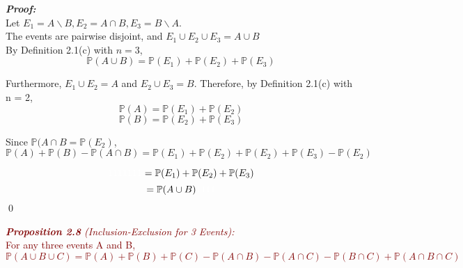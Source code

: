 \documentclass{report}
\newenvironment{cframedp}[1][Black]
  {\begin{tcolorbox}[colframe=#1,colback=white]}
  {\end{tcolorbox}}
\newenvironment{cframedprop}[1][Maroon]
  {\begin{tcolorbox}[colframe=#1,colback=white]}
  {\end{tcolorbox}}
\begin{document}
\begin{cframedp}
\textit{\textbf{Proof:}}\\
Let $E_1 = A \backslash B, E_2 = A \cap B, E_3 = B \backslash A.$\\
The events are pairwise disjoint, and $E_1 \cup E_2 \cup E_3 = A \cup B$\\

By Definition 2.1(c) with $n=3$,
\begin{equation}
    \mathbb{P}(A \cup B) = \mathbb{P}(E_1) + \mathbb{P}(E_2) + \mathbb{P}(E_3)
\end{equation}

Furthermore, $E_1 \cup E_2 = A$ and $E_2 \cup E_3 = B$. Therefore, by Definition 2.1(c) with n = 2,\\
\begin{equation}
    \mathbb{P}(A) = \mathbb{P}(E_1) + \mathbb{P}(E_2)
\end{equation}
\begin{equation}
    \mathbb{P}(B) = \mathbb{P}(E_2) + \mathbb{P}(E_3)
\end{equation}

Since $\mathbb{P}(A \cap B = \mathbb{P}(E_2)$,
\begin{equation}
    \mathbb{P}(A) + \mathbb{P}(B) - \mathbb{P}(A \cap B) = \mathbb{P}(E_1) + \mathbb{P}(E_2) + \mathbb{P}(E_2) + \mathbb{P}(E_3) - \mathbb{P}(E_2)
\end{equation}

\begin{equation}
   \textcolor{White}{1111111} = \mathbb{P}(E_1) + \mathbb{P}(E_2) + \mathbb{P}(E_3)
\end{equation}
\begin{equation}
    = \mathbb{P}(A \cup B) \textcolor{White}{1111}
\end{equation}
\qed
\end{cframedp}

\begin{cframedprop}
\textcolor{Maroon}{\textit{\textbf{Proposition 2.8} (Inclusion-Exclusion for 3 Events):}}\\
\textcolor{Maroon}{For any three events A and B,
\begin{equation}
    \mathbb{P}(A \cup B \cup C) = \mathbb{P}(A) + \mathbb{P}(B) + \mathbb{P}(C) - \mathbb{P}(A \cap B) - \mathbb{P}(A \cap C) - \mathbb{P}(B \cap C) + \mathbb{P}(A \cap B \cap C)
\end{equation}}
\end{cframedprop}
\end{document}
